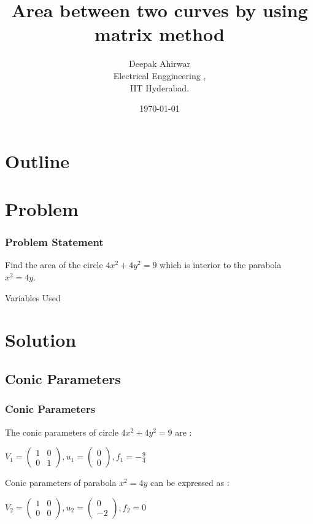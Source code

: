 \documentclass{beamer}
\title{Area between two curves by using matrix method}
\author{Deepak Ahirwar  \\ Electrical Enggineering ,\\IIT Hyderabad.}
\date{\today}
\theoremstyle{remark}
\newcommand{\myvec}[1]{\ensuremath{\begin{pmatrix}#1\end{pmatrix}}}
\numberwithin{equation}{section}
\begin{document}
 

\begin{frame}
\titlepage
\end{frame}

\section*{Outline}
\begin{frame}
\tableofcontents
\end{frame}
\section{Problem}
\begin{frame}
\frametitle{Problem Statement}

Find the area of the circle $ 4x^2 + 4y^2 = 9$ which is interior to the parabola $x^2 = 4y.$
\\ \begin{table}[h!]    
  \centering
  
  \caption{Variables Used}
\end{table}

\end{frame}

\section{Solution}
\subsection{Conic Parameters}
\begin{frame}
\frametitle{Conic Parameters}
 The conic parameters of circle $4x^2+4y^2=9$ are :
 \begin{center}
      $V_1 = \myvec{ 1 &0\\ 0 &1}, u_1 =\myvec{0 \\ 0}, f_1 = -\frac{9}{4} $
 \end{center}
 Conic parameters of parabola $x^2=4y$ can be expressed as :
 \begin{center}
      $V_2 = \myvec{ 1 &0\\ 0 &0}, u_2 =\myvec{0 \\ -2}, f_2 = 0$
 \end{center}
 
\end{frame}
\end{document}
